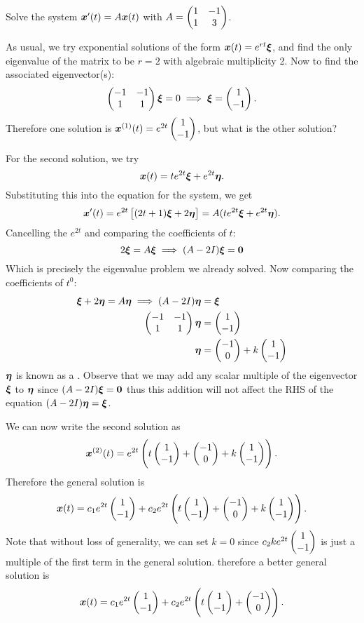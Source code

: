 \begin{eg}\label{eg:repeigs}
	Solve the system $\bm{x}'(t) = A\bm{x}(t)$ with $A = \begin{pmatrix}1 & -1 \\ 1 & 3\end{pmatrix}$.
	
	As usual, we try exponential solutions of the form $\bm{x}(t) = e^{rt}\bm{\xi}$, and find the only eigenvalue of the matrix to be $r=2$ with algebraic multiplicity 2. Now to find the associated eigenvector(s):
	\[
	\begin{pmatrix}-1 & -1 \\ 1 & 1\end{pmatrix}\bm{\xi} = 0 \implies \bm{\xi} = \begin{pmatrix}1 \\ -1\end{pmatrix}.
	\]
	Therefore one solution is $\bm{x}^{(1)}(t) = e^{2t}\begin{pmatrix}1 \\ -1\end{pmatrix}$, but what is the other solution?
	
	For the second solution, we try
	\[
	\bm{x}(t) = te^{2t}\bm{\xi} + e^{2t}\bm{\eta}.
	\]
	Substituting this into the equation for the system, we get
	\[
	\bm{x}'(t) = e^{2t}\left[(2t+1)\bm{\xi} + 2\bm{\eta}\right] = A(te^{2t}\bm{\xi} + e^{2t}\bm{\eta}).
	\]
	Cancelling the $e^{2t}$ and comparing the coefficients of $t$:
	\[
	2\bm{\xi} = A\bm{\xi} \implies (A-2I) \bm{\xi} = \bm{0}
	\]
	Which is precisely the eigenvalue problem we already solved. Now comparing the coefficients of $t^0$:
	\begin{align*}
		\bm{\xi} + 2\bm{\eta} = A\bm{\eta} \implies (A-2I)\bm{\eta} &= \bm{\xi} \\ \begin{pmatrix}-1 & -1 \\ 1 & 1\end{pmatrix}\bm{\eta} &= \begin{pmatrix}1 \\ -1\end{pmatrix} \\
		\bm{\eta} &= \begin{pmatrix}-1 \\ 0\end{pmatrix} + k\begin{pmatrix}1 \\ -1\end{pmatrix}
	\end{align*}
	$\bm{\eta}$ is known as a . Observe that we may add any scalar multiple of the eigenvector $\bm{\xi}$ to $\bm{\eta}$ since $(A-2I)\bm{\xi} = \bm{0}$ thus this addition will not affect the RHS of the equation $(A-2I)\bm{\eta} = \bm{\xi}$.
	
	We can now write the second solution as
	\[
	\bm{x}^{(2)}(t) = e^{2t}\left(t\begin{pmatrix}1 \\ -1\end{pmatrix} + \begin{pmatrix}-1 \\ 0\end{pmatrix} + k\begin{pmatrix}1 \\ -1\end{pmatrix}\right).
	\]
	Therefore the general solution is
	\[
	\bm{x}(t) = c_1 e^{2t}\begin{pmatrix}1 \\ -1\end{pmatrix} + c_2 e^{2t}\left(t\begin{pmatrix}1 \\ -1\end{pmatrix} + \begin{pmatrix}-1 \\ 0\end{pmatrix} + k\begin{pmatrix}1 \\ -1\end{pmatrix}\right).
	\]
	Note that without loss of generality, we can set $k=0$ since $c_2 k e^{2t}\begin{pmatrix}1 \\ -1\end{pmatrix}$ is just a multiple of the first term in the general solution. therefore a better general solution is
	\[
	\bm{x}(t) = c_1 e^{2t}\begin{pmatrix}1 \\ -1\end{pmatrix} + c_2 e^{2t}\left(t\begin{pmatrix}1 \\ -1\end{pmatrix} + \begin{pmatrix}-1 \\ 0\end{pmatrix}\right).
	\]
\end{eg}

